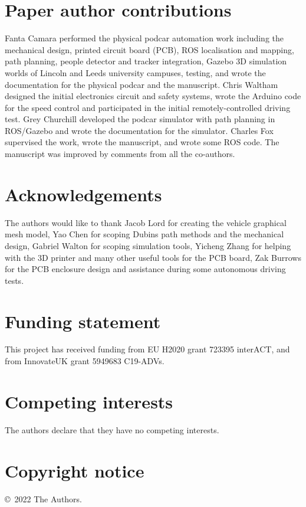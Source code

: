 \documentclass[a4paper]{article}
\begin{document}
	
	\section*{Paper author contributions}\label{h.fy8hbipy6kwe}
	
	Fanta Camara performed the physical podcar automation work including the mechanical design, printed circuit board (PCB), ROS localisation and mapping, path planning, people detector and tracker integration, Gazebo 3D simulation worlds of Lincoln and Leeds university campuses, testing, and wrote the documentation for the physical podcar and  the manuscript. Chris Waltham designed the initial electronics circuit and safety systems, wrote the Arduino code for the speed control and participated in the initial remotely-controlled driving test. Grey Churchill developed the podcar simulator with path planning in ROS/Gazebo and wrote the documentation for the simulator. Charles Fox supervised the work, wrote the manuscript, and wrote some ROS code. The manuscript was improved by comments from all the co-authors.
	
	
	\section*{Acknowledgements}\label{h.gu3yyarx72d6}
	
	The authors would like to thank Jacob Lord for creating the vehicle graphical mesh model, Yao Chen for scoping Dubins path methods and the mechanical design, Gabriel Walton for scoping simulation tools, Yicheng Zhang for helping with the 3D printer and many other useful tools for the PCB board, Zak Burrows for the PCB enclosure design and assistance during some autonomous driving tests.
	
	
	\section*{Funding statement}\label{h.4u1a7tugh2om}
	
	This project has received funding from EU H2020 grant 723395 interACT, and from InnovateUK  grant 5949683 C19-ADVs.
	
	
	\section*{Competing interests}\label{h.q1j1rznb43fl}
	
	The authors declare that they have no competing interests.
	
	
	
	
	
	\section*{Copyright notice}\label{h.jm5gcqv4g8x0}
	
	\copyright~2022 The Authors. %
	
	
	
\end{document}
